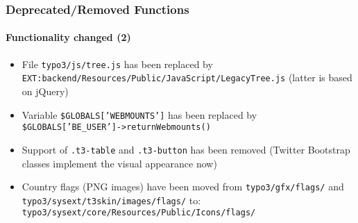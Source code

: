 \begin{frame}[fragile]
	\frametitle{Deprecated/Removed Functions}
	\framesubtitle{Functionality changed (2)}

	\begin{itemize}

		\item File
			\small\texttt{typo3/js/tree.js}\normalsize\space
			has been replaced by
			\small\texttt{EXT:backend/Resources/Public/JavaScript/LegacyTree.js}\normalsize\newline
			(latter is based on jQuery)

		\item Variable
			\small\texttt{\$GLOBALS['WEBMOUNTS']}\normalsize\space
			has been replaced by
			\small\texttt{\$GLOBALS['BE\_USER']->returnWebmounts()}\normalsize

		\item Support of
			\small\texttt{.t3-table}\normalsize\space
			and
			\small\texttt{.t3-button}\normalsize\space
			has been removed\newline
			\small
				(Twitter Bootstrap classes implement the visual appearance now)
			\normalsize

		\item Country flags (PNG images) have been moved from
			\small\texttt{typo3/gfx/flags/}\normalsize
			and
			\small\texttt{typo3/sysext/t3skin/images/flags/}\normalsize\newline
			to: \small\texttt{typo3/sysext/core/Resources/Public/Icons/flags/}\normalsize

	\end{itemize}

\end{frame}


